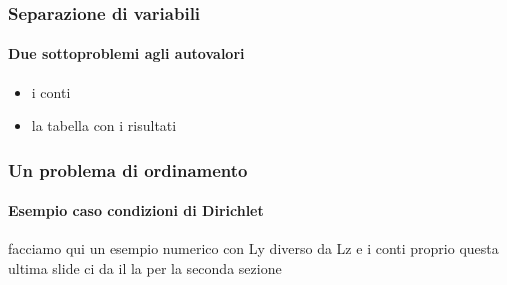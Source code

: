 \begin{frame}
 \frametitle{Separazione di variabili}
 \framesubtitle{Due sottoproblemi agli autovalori}
 \begin{itemize}
 \item i conti
 \item la tabella con i risultati
 \end{itemize}
\end{frame}

\begin{frame}
 \frametitle{Un problema di ordinamento}
 \framesubtitle{Esempio caso condizioni di Dirichlet}
 
 facciamo qui un esempio numerico con Ly diverso da Lz e i conti proprio
 questa ultima slide ci da il la per la seconda sezione
\end{frame}